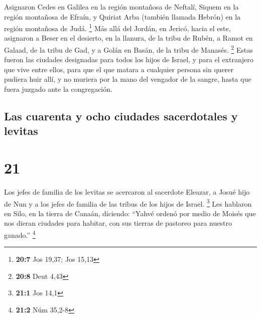  Asignaron Cedes en Galilea en la región montañosa de
Neftalí, Siquem en la región montañosa de Efraín, y Quiriat Arba
(también llamada Hebrón) en la región montañosa de Judá. \footnote{\textbf{20:7}
  Jos 19,37; Jos 15,13}  Más allá del Jordán, en Jericó,
hacia el este, asignaron a Beser en el desierto, en la llanura, de la
tribu de Rubén, a Ramot en Galaad, de la tribu de Gad, y a Golán en
Basán, de la tribu de Manasés. \footnote{\textbf{20:8} Deut 4,43}
 Estas fueron las ciudades designadas para todos los hijos
de Israel, y para el extranjero que vive entre ellos, para que el que
matara a cualquier persona sin querer pudiera huir allí, y no muriera
por la mano del vengador de la sangre, hasta que fuera juzgado ante la
congregación.

\hypertarget{las-cuarenta-y-ocho-ciudades-sacerdotales-y-levitas}{%
\subsection{Las cuarenta y ocho ciudades sacerdotales y
levitas}\label{las-cuarenta-y-ocho-ciudades-sacerdotales-y-levitas}}

\hypertarget{section-20}{%
\section{21}\label{section-20}}

 Los jefes de familia de los levitas se acercaron al
sacerdote Eleazar, a Josué hijo de Nun y a los jefes de familia de las
tribus de los hijos de Israel. \footnote{\textbf{21:1} Jos 14,1}
 Les hablaron en Silo, en la tierra de Canaán, diciendo:
``Yahvé ordenó por medio de Moisés que nos dieran ciudades para habitar,
con sus tierras de pastoreo para nuestro ganado.'' \footnote{\textbf{21:2}
  Núm 35,2-8}

